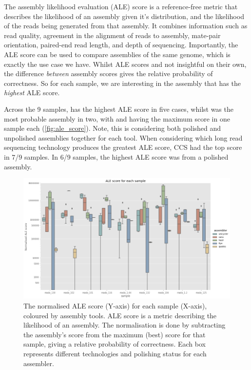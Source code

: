 The assembly likelihood evaluation (ALE) score is a reference-free metric that describes the likelihood of an assembly given it's \kmer{} distribution, and the likelihood of the reads being generated from that assembly. It combines information such as read quality, agreement in the alignment of reads to assembly, mate-pair orientation, paired-end read length, and depth of sequencing. Importantly, the ALE score can be used to compare assemblies of the same genome, which is exactly the use case we have. Whilst ALE scores and not insightful on their own, the difference \textit{between} assembly scores gives the relative probability of correctness. So for each sample, we are interesting in the assembly that has the \textit{highest} ALE score.  

Across the 9 samples,  has the highest ALE score in five cases, whilst  was the most probable assembly in two, with  and  having the maximum score in one sample each (\autoref{fig:ale_score}). Note, this is considering both polished and unpolished assemblies together for each tool. When considering which long read sequencing technology produces the greatest ALE score, CCS had the top score in 7/9 samples. In 6/9 samples, the highest ALE score was from a polished assembly.



\begin{figure}
\includegraphics[width=1.0\textwidth]{Chapter2/Figs/ale_score.png}
\centering
\caption{The normalised ALE score (Y-axis) for each sample (X-axis), coloured by assembly tools. ALE score is a metric describing the likelihood of an assembly. The normalisation is done by subtracting the assembly's score from the maximum (best) score for that sample, giving a relative probability of correctness. Each box represents different technologies and polishing status for each assembler.}
\label{fig:ale_score}
\end{figure}



